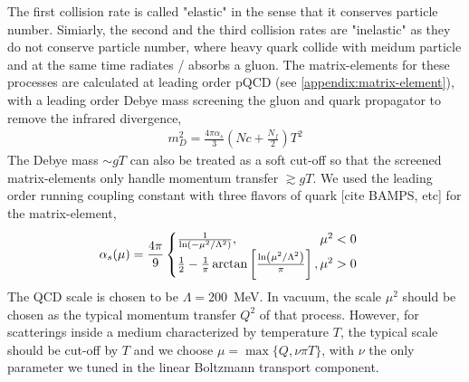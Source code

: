 \documentclass[aps, prc, reprint, amsmath, groupedaddress, nofootinbib]{revtex4-1}
\begin{document}
The first collision rate is called "elastic" in the sense that it conserves particle number.
Simiarly, the second and the third collision rates are "inelastic" as they do not conserve particle number, where heavy quark collide with meidum particle and at the same time radiates / absorbs a gluon.
The matrix-elements for these processes are calculated at leading order pQCD (see \ref{appendix:matrix-element}), with a leading order Debye mass screening the gluon and quark propagator to remove the infrared divergence,
\begin{eqnarray}
m_D^2 = \frac{4\pi\alpha_s}{3}(Nc+\frac{N_f}{2})T^2
\end{eqnarray}
The Debye mass $\sim gT$ can also be treated as a soft cut-off so that the screened matrix-elements only handle momentum transfer $\gtrsim gT$.
We used the leading order running coupling constant with three flavors of quark [cite BAMPS, etc] for the matrix-element,
\begin{eqnarray}
\alpha_s(\mu) = \frac{4\pi}{9}
\begin{cases}
\frac{1}{\ln\left(-\mu^2/\Lambda^2\right)},\hfill \mu^2 < 0 \\ 
\frac{1}{2} - \frac{1}{\pi}\arctan\left[\frac{\ln\left(\mu^2/\Lambda^2\right)}{\pi}\right],\mu^2 > 0
\end{cases}
\end{eqnarray}
The QCD scale is chosen to be $\Lambda = 200$~MeV.
In vacuum, the scale $\mu^2$ should be chosen as the typical momentum transfer $Q^2$ of that process.
However, for scatterings inside a medium characterized by temperature $T$, the typical scale should be cut-off by $T$ and we choose $\mu = \max\{Q, \nu\pi T \}$, with $\nu$ the only parameter we tuned in the linear Boltzmann transport component.
\end{document}
